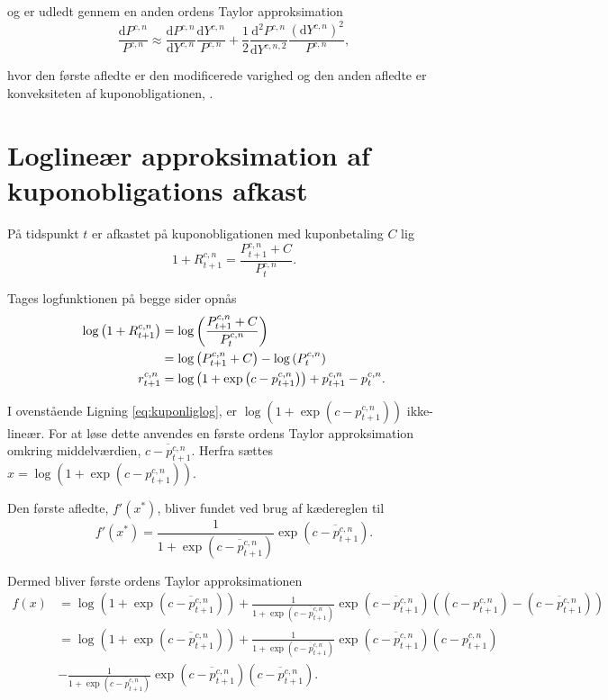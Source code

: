 \documentclass[
  a4paper,
  oneside]{memoir}
\begin{document}
og er udledt gennem en anden ordens Taylor approksimation
\begin{equation*}
\frac{\text{d} P^{c,n}}{P^{c,n}}\approx \frac{\text{d} P^{c,n}}{\text{d} Y^{c,n}}\frac{\text{d} Y^{c,n}}{P^{c,n}}+\frac{1}{2}\frac{\text{d}^2 P^{c,n}}{\text{d} Y^{c,n,2}}\frac{\left(\text{d}Y^{c,n}\right)^2}{P^{c,n}},
\end{equation*}

hvor den første afledte er den modificerede varighed og den anden afledte er konveksiteten af kuponobligationen, \citep{Campbell1997}.

\hypertarget{loglineuxe6r-approksimation-af-kuponobligations-afkast}{%
\section{Loglineær approksimation af kuponobligations afkast}\label{loglineuxe6r-approksimation-af-kuponobligations-afkast}}

På tidspunkt \(t\) er afkastet på kuponobligationen med kuponbetaling \(C\) lig
\begin{equation*}
1+R_{t+1}^{c,n}=\frac{P_{t+1}^{c,n} + C}{P_t^{c,n}}.
\end{equation*}

Tages logfunktionen på begge sider opnås
\begin{align}
\log\left(1+R_{t+1}^{c,n}\right)&=\log\left(\frac{P_{t+1}^{c,n} + C}{P_t^{c,n}}\right)\notag\\
&=\log\left(P_{t+1}^{c,n} + C\right) - \log\left(P_t^{c,n}\right)\notag\\
r_{t+1}^{c,n}&=\log\left(1+\exp\left(c- p_{t+1}^{c,n}\right)\right) + p_{t+1}^{c,n} - p_t^{c,n}.\label{eq:kuponliglog}
\end{align}

I ovenstående Ligning \eqref{eq:kuponliglog}, er \(\log\left(1+\exp\left(c- p_{t+1}^{c,n}\right)\right)\) ikke-lineær. For at løse dette anvendes en første ordens Taylor approksimation omkring middelværdien, \(\overline{c- p_{t+1}^{c,n}}\). Herfra sættes \(x=\log\left(1+\exp\left(c- p_{t+1}^{c,n}\right)\right)\).

Den første afledte, \(f'\left(x^*\right)\), bliver fundet ved brug af kædereglen til
\[f'\left(x^*\right)=\frac{1}{1+\exp\left(\overline{c- p_{t+1}^{c,n}}\right)}\exp\left(\overline{c- p_{t+1}^{c,n}}\right).\]

Dermed bliver første ordens Taylor approksimationen
\begin{align*}
f\left(x\right)&=\log\left(1+\exp\left(\overline{c- p_{t+1}^{c,n}}\right)\right)+ \frac{1}{1+\exp\left(\overline{c- p_{t+1}^{c,n}}\right)}\exp\left(\overline{c- p_{t+1}^{c,n}}\right) \left(\left(c-p_{t+1}^{c,n}\right) -\left(\overline{c- p_{t+1}^{c,n}}\right)\right)\\
&=\log\left(1+\exp\left(\overline{c- p_{t+1}^{c,n}}\right)\right) + \frac{1}{1+\exp\left(\overline{c- p_{t+1}^{c,n}}\right)}\exp\left(\overline{c- p_{t+1}^{c,n}}\right) \left(c-p_{t+1}^{c,n}\right)\\
\quad&- \frac{1}{1+\exp\left(\overline{c- p_{t+1}^{c,n}}\right)}\exp\left(\overline{c- p_{t+1}^{c,n}}\right)\left(\overline{c- p_{t+1}^{c,n}}\right).
\end{align*}
\end{document}
